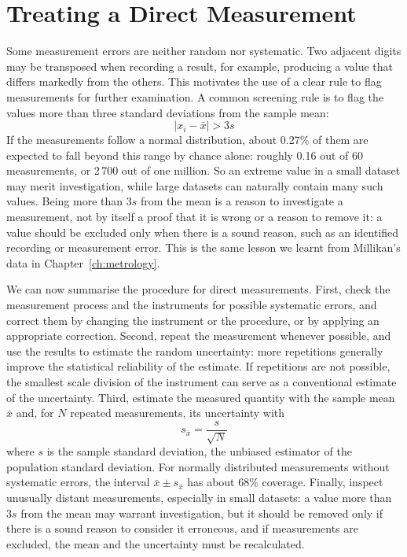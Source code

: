 \documentclass[letterpaper,11pt,leqno]{book}
\begin{document}
\section{Treating a Direct Measurement}
\label{sec:summary_direct}

Some measurement errors are neither random nor systematic. Two adjacent digits may be transposed when recording a result, for example, producing a value that differs markedly from the others. This motivates the use of a clear rule to flag measurements for further examination. A common screening rule is to flag the values more than three standard deviations from the sample mean:
\begin{equation}
\boxed{|x_i - \bar{x}| > 3s}
\label{eq:three_sigma_rule}
\end{equation}
If the measurements follow a normal distribution, about 0.27\% of them are expected to fall beyond this range by chance alone: roughly 0.16 out of 60 measurements, or 2\,700 out of one million. So an extreme value in a small dataset may merit investigation, while large datasets can naturally contain many such values. Being more than $3s$ from the mean is a reason to investigate a measurement, not by itself a proof that it is wrong or a reason to remove it: a value should be excluded only when there is a sound reason, such as an identified recording or measurement error. This is the same lesson we learnt from Millikan's data in Chapter~\ref{ch:metrology}.

We can now summarise the procedure for direct measurements. First, check the measurement process and the instruments for possible systematic errors, and correct them by changing the instrument or the procedure, or by applying an appropriate correction. Second, repeat the measurement whenever possible, and use the results to estimate the random uncertainty: more repetitions generally improve the statistical reliability of the estimate. If repetitions are not possible, the smallest scale division of the instrument can serve as a conventional estimate of the uncertainty. Third, estimate the measured quantity with the sample mean $\bar{x}$ and, for $N$ repeated measurements, its uncertainty with
\begin{equation}
\boxed{s_{\bar{x}} = \frac{s}{\sqrt{N}}}
\label{eq:uncertainty_mean_summary}
\end{equation}
where $s$ is the sample standard deviation, the unbiased estimator of the population standard deviation. For normally distributed measurements without systematic errors, the interval $\bar{x} \pm s_{\bar{x}}$ has about 68\% coverage. Finally, inspect unusually distant measurements, especially in small datasets: a value more than $3s$ from the mean may warrant investigation, but it should be removed only if there is a sound reason to consider it erroneous, and if measurements are excluded, the mean and the uncertainty must be recalculated.
\end{document}
